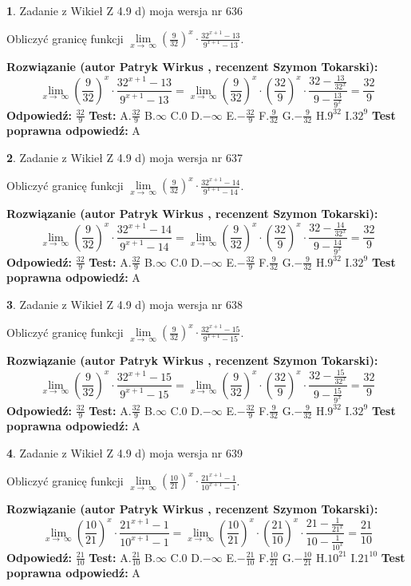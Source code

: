 \documentclass[12pt, a4paper]{article}
\theoremstyle{definition} %
\newtheorem{zad}{}
\newcommand{\zadStart}[1]{\begin{zad}#1\newline}
\newcommand{\zadStop}{\end{zad}}
\newcommand{\rozwStart}[2]{\noindent \textbf{Rozwiązanie (autor #1 , recenzent #2): }\newline}
\newcommand{\rozwStop}{\newline}
\newcommand{\odpStart}{\noindent \textbf{Odpowiedź:}\newline}
\newcommand{\odpStop}{\newline}
\newcommand{\testStart}{\noindent \textbf{Test:}\newline}
\newcommand{\testStop}{\newline}
\newcommand{\kluczStart}{\noindent \textbf{Test poprawna odpowiedź:}\newline}
\newcommand{\kluczStop}{\newline}
\begin{document}
\zadStart{Zadanie z Wikieł Z 4.9 d) moja wersja nr 636}


Obliczyć granicę funkcji  $\lim\limits_{x\to\ \infty}(\frac{9}{32})^{x}\cdot\frac{32^{x+1}-13}{9^{x+1}-13}$.
\zadStop
\rozwStart{Patryk Wirkus}{Szymon Tokarski}
$$\lim\limits_{x\to\ \infty}(\frac{9}{32})^{x}\cdot\frac{32^{x+1}-13}{9^{x+1}-13}=\lim\limits_{x\to\ \infty}(\frac{9}{32})^{x}\cdot(\frac{32}{9})^{x} \cdot \frac{32-\frac{13}{32^{x}}}{9-\frac{13}{9^{x}}} = \frac{32}{9}$$
\rozwStop
\odpStart
$\frac{32}{9}$
\odpStop
\testStart
A.$\frac{32}{9}$ B.$\infty$ C.$0$ D.$-\infty$ E.$-\frac{32}{9}$
F.$\frac{9}{32}$ G.$-\frac{9}{32}$
H.$9^{32}$
I.$32^{9}$
\testStop
\kluczStart
A
\kluczStop



\zadStart{Zadanie z Wikieł Z 4.9 d) moja wersja nr 637}


Obliczyć granicę funkcji  $\lim\limits_{x\to\ \infty}(\frac{9}{32})^{x}\cdot\frac{32^{x+1}-14}{9^{x+1}-14}$.
\zadStop
\rozwStart{Patryk Wirkus}{Szymon Tokarski}
$$\lim\limits_{x\to\ \infty}(\frac{9}{32})^{x}\cdot\frac{32^{x+1}-14}{9^{x+1}-14}=\lim\limits_{x\to\ \infty}(\frac{9}{32})^{x}\cdot(\frac{32}{9})^{x} \cdot \frac{32-\frac{14}{32^{x}}}{9-\frac{14}{9^{x}}} = \frac{32}{9}$$
\rozwStop
\odpStart
$\frac{32}{9}$
\odpStop
\testStart
A.$\frac{32}{9}$ B.$\infty$ C.$0$ D.$-\infty$ E.$-\frac{32}{9}$
F.$\frac{9}{32}$ G.$-\frac{9}{32}$
H.$9^{32}$
I.$32^{9}$
\testStop
\kluczStart
A
\kluczStop



\zadStart{Zadanie z Wikieł Z 4.9 d) moja wersja nr 638}


Obliczyć granicę funkcji  $\lim\limits_{x\to\ \infty}(\frac{9}{32})^{x}\cdot\frac{32^{x+1}-15}{9^{x+1}-15}$.
\zadStop
\rozwStart{Patryk Wirkus}{Szymon Tokarski}
$$\lim\limits_{x\to\ \infty}(\frac{9}{32})^{x}\cdot\frac{32^{x+1}-15}{9^{x+1}-15}=\lim\limits_{x\to\ \infty}(\frac{9}{32})^{x}\cdot(\frac{32}{9})^{x} \cdot \frac{32-\frac{15}{32^{x}}}{9-\frac{15}{9^{x}}} = \frac{32}{9}$$
\rozwStop
\odpStart
$\frac{32}{9}$
\odpStop
\testStart
A.$\frac{32}{9}$ B.$\infty$ C.$0$ D.$-\infty$ E.$-\frac{32}{9}$
F.$\frac{9}{32}$ G.$-\frac{9}{32}$
H.$9^{32}$
I.$32^{9}$
\testStop
\kluczStart
A
\kluczStop



\zadStart{Zadanie z Wikieł Z 4.9 d) moja wersja nr 639}


Obliczyć granicę funkcji  $\lim\limits_{x\to\ \infty}(\frac{10}{21})^{x}\cdot\frac{21^{x+1}-1}{10^{x+1}-1}$.
\zadStop
\rozwStart{Patryk Wirkus}{Szymon Tokarski}
$$\lim\limits_{x\to\ \infty}(\frac{10}{21})^{x}\cdot\frac{21^{x+1}-1}{10^{x+1}-1}=\lim\limits_{x\to\ \infty}(\frac{10}{21})^{x}\cdot(\frac{21}{10})^{x} \cdot \frac{21-\frac{1}{21^{x}}}{10-\frac{1}{10^{x}}} = \frac{21}{10}$$
\rozwStop
\odpStart
$\frac{21}{10}$
\odpStop
\testStart
A.$\frac{21}{10}$ B.$\infty$ C.$0$ D.$-\infty$ E.$-\frac{21}{10}$
F.$\frac{10}{21}$ G.$-\frac{10}{21}$
H.$10^{21}$
I.$21^{10}$
\testStop
\kluczStart
A
\kluczStop
\end{document}
